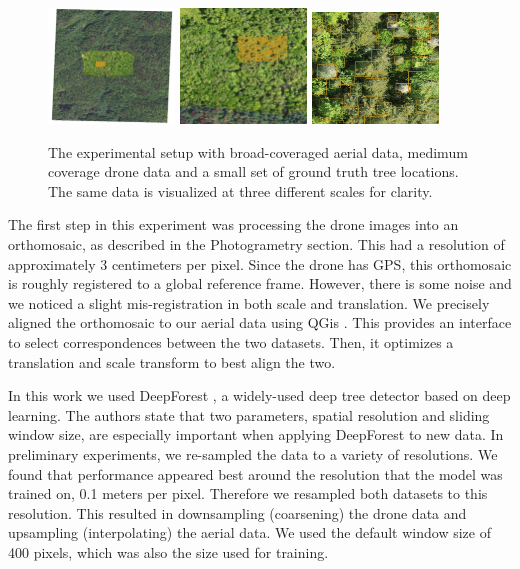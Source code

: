 \begin{figure}
    \centering
    \includegraphics[width=0.3\textwidth]{figs/methods/tree_detection/multiscale_outset.png}
    \includegraphics[width=0.3\textwidth]{figs/methods/tree_detection/multiscale_inset.png}
    \includegraphics[width=0.3\textwidth]{figs/methods/tree_detection/multiscale_in_inset.png}
    \caption{The experimental setup with broad-coveraged aerial data, medimum coverage drone data and a small set of ground truth tree locations. The same data is visualized at three different scales for clarity.}
    \label{fig:methods:multi_scale_tree_det}
\end{figure}

The first step in this experiment was processing the drone images into an orthomosaic, as described in the Photogrametry section. This had a resolution of approximately 3 centimeters per pixel. Since the drone has GPS, this orthomosaic is roughly registered to a global reference frame. However, there is some noise and we noticed a slight mis-registration in both scale and translation. We precisely aligned the orthomosaic to our aerial data using QGis \cite{QGIS_software}. This provides an interface to select correspondences between the two datasets. Then, it optimizes a translation and scale transform to best align the two. 

In this work we used DeepForest \cite{Weinstein2020DeepForest:Delineation}, a widely-used deep tree detector based on deep learning.
The authors state that two parameters, spatial resolution and sliding window size, are especially important when applying DeepForest to new data. In preliminary experiments, we re-sampled the data to a variety of resolutions. We found that performance appeared best around the resolution that the model was trained on, 0.1 meters per pixel. Therefore we resampled both datasets to this resolution. This resulted in downsampling (coarsening) the drone data and upsampling (interpolating) the aerial data. We used the default window size of 400 pixels, which was also the size used for training.

